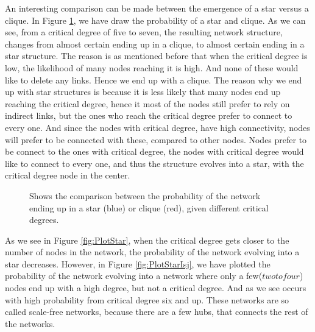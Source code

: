 An interesting comparison can be made between the emergence of a star versus a clique. In Figure \ref{fig:PlotStarVsClique}, we have draw the probability of a star and clique. As we can see, from a critical degree of five to seven, the resulting network structure, changes from almost certain ending up in a clique, to almost certain ending in a star structure. The reason is as mentioned before that when the critical degree is low, the likelihood of many nodes reaching it is high. And none of these would like to delete any links. Hence we end up with a clique. The reason why we end up with star structures is because it is less likely that many nodes end up reaching the critical degree, hence it most of the nodes still prefer to rely on indirect links, but the ones who reach the critical degree prefer to connect to every one. And since the nodes with critical degree, have high connectivity, nodes will prefer to be connected with these, compared to other nodes. Nodes prefer to be connect to the ones with critical degree, the nodes with critical degree would like to connect to every one, and thus the structure evolves into a star, with the critical degree node in the center. 


\begin{figure}
\centering
{}
    \caption{\label{fig:PlotStarVsClique} Shows the comparison between the probability of the network ending up in a star (blue) or clique (red), given different critical degrees.}
\end{figure}

As we see in Figure \ref{fig:PlotStar}, when the critical degree gets closer to the number of nodes in the network, the probability of the network evolving into a star decreases. However, in Figure \ref{fig:PlotStarIsj}, we have plotted the probability of the network evolving into a network where only a few($two to four$) nodes end up with a high degree, but not a critical degree. And as we see occurs with high probability from critical degree six and up. These networks are so called scale-free networks, because there are a few hubs, that connects the rest of the networks. 


